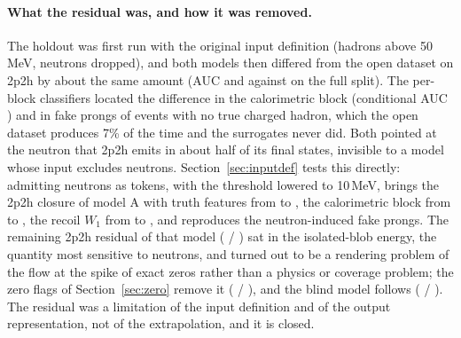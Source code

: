 \documentclass[11pt]{article}
\begin{document}
\paragraph{What the residual was, and how it was removed.} The holdout was first run with the original input
definition (hadrons above 50\,MeV, neutrons dropped), and both models then differed from the open dataset on 2p2h
by about the same amount (AUC \nHoldAAUCmarg{} and \nHoldBAUCmarg{} against \nHoldFullAUCmarg{} on the full
split). The per-block classifiers located the difference in the calorimetric block (conditional AUC
\nHoldACalo{}) and in fake prongs of events with no true charged hadron, which the open dataset produces 7\% of
the time and the surrogates never did. Both pointed at the neutron that 2p2h emits in about half of its final
states, invisible to a model whose input excludes neutrons. Section~\ref{sec:inputdef} tests this directly:
admitting neutrons as tokens, with the threshold lowered to 10\,MeV, brings the 2p2h closure of model A with
truth features from \nVKEfiftyTwoPAUCcond{} to \nVKEtennTwoPAUCcond{}, the calorimetric block from
\nVKEfiftyTwoPCalo{} to \nVKEtennTwoPCalo{}, the recoil $W_1$ from \nVKEfiftyTwoPWoneRecoil{} to
\nVKEtennTwoPWoneRecoil{}, and reproduces the neutron-induced fake prongs. The remaining 2p2h residual of that
model (\nZCAonheldoutTwoPTwoHOldM{} / \nZCAonheldoutTwoPTwoHOldC{}) sat in the isolated-blob energy, the quantity most
sensitive to neutrons, and turned out to be a rendering problem of the flow at the spike of exact zeros rather
than a physics or coverage problem; the zero flags of Section~\ref{sec:zero} remove it
(\nZCAonheldoutTwoPTwoHNewM{} / \nZCAonheldoutTwoPTwoHNewC{}), and the blind model follows
(\nZCBonheldoutTwoPTwoHNewM{} / \nZCBonheldoutTwoPTwoHNewC{}). The residual was a limitation of the input definition
and of the output representation, not of the extrapolation, and it is closed.
\end{document}
